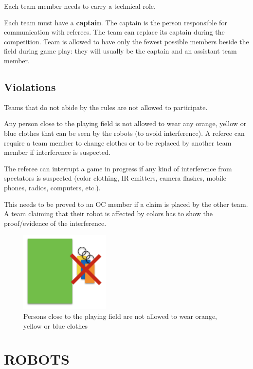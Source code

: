 \documentclass{article}
\begin{document}
Each team member needs to carry a technical role.

Each team must have a \textbf{captain}. The captain is the person responsible
for communication with referees. The team can replace its captain during the
competition. Team is allowed to have only the fewest possible members beside
the field during game play: they will usually be the captain and an assistant
team member.

\subsection{Violations \label{ref-017}}

Teams that do not abide by the rules are not allowed to participate.

Any person close to the playing field is not allowed to wear any orange, yellow
or blue clothes that can be seen by the robots (to avoid interference). A
referee can require a team member to change clothes or to be replaced by
another team member if interference is suspected.

The referee can interrupt a game in progress if any kind of interference from
spectators is suspected (color clothing, IR emitters, camera flashes, mobile
phones, radios, computers, etc.).

This needs to be proved to an OC member if a claim is placed by the other team.
A team claiming that their robot is affected by colors has to show the
proof/evidence of the interference.

\begin{figure}[H]
    \centering
    \includegraphics[width=0.4\textwidth]{media/image2.png}
    \caption{Persons close to the playing field are not allowed to wear orange,
        yellow or blue clothes}
    \label{fig:spectators}
\end{figure}


\section{ROBOTS\label{ref-018}}
\end{document}
